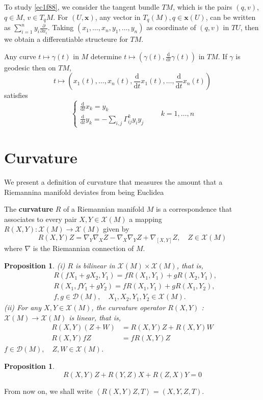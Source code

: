 \documentclass{amsart}
\theoremstyle{plain}
\newtheorem{proposition}[theorem]{Proposition}
\theoremstyle{definition}
\theoremstyle{remark}
\begin{document}
To study \cref{ec1f88}, we consider the tangent bundle $TM$, which is the pairs $(q,v)$, $q\in M$, $v\in T_{q}M$. For $(U,\mathbf{x})$, any vector in $T_{q}(M), q\in \mathbf{x}(U)$, can be written as $\sum_{i=1}^{n}y_i\frac{ \partial   }{ \partial x_i }$. Taking $(x_1,\dots,x_n,y_1,\dots,y_n)$ as coordinate of $(q,v)$ in $TU$, then we obtain a differentiable structeure for $TM$.

Any curve $t\mapsto\gamma(t)$ in $M$ determine $t\mapsto\left( \gamma(t),\frac{\mathrm{d}}{\mathrm{d}t}\gamma(t) \right)$ in $TM$. If $\gamma$ is geodesic then on $TM$,
\[
t\mapsto\left( x_1(t),\dots,x_n(t),\frac{\mathrm{d}}{\mathrm{d}t} x_1(t),\dots,\frac{\mathrm{d}}{\mathrm{d}t} x_n(t) \right)
\]
satisfies
\[
\begin{cases}
\frac{\mathrm{d}}{\mathrm{d}t} x_k=y_k \\
\frac{\mathrm{d}}{\mathrm{d}t} y_k=-\sum_{i,j}\Gamma^{k}_{ij}y_iy_j
\end{cases}\qquad k=1,\dots,n
\]
\section{Curvature}

We present a definition of curvature that measures the amount that a Riemannina manifold deviates from being Euclidea

The \textbf{curvature} $R$ of a Riemannian manifold $M$ is a correspondence that associates to every pair $X, Y \in \mathcal{X}(M)$ a mapping $R(X, Y): \mathcal{X}(M) \rightarrow \mathcal{X}(M)$ given by
\[
R(X, Y) Z=\nabla_Y \nabla_X Z-\nabla_X \nabla_Y Z+\nabla_{[X, Y]} Z, \quad Z \in \mathcal{X}(M)
\]
where $\nabla$ is the Riemannian connection of $M$.

\begin{proposition}
(i) $R$ is bilinear in $\mathcal{X}(M) \times \mathcal{X}(M)$, that is,
\[
\begin{aligned}
& R\left(f X_1+g X_2, Y_1\right)=f R\left(X_1, Y_1\right)+g R\left(X_2, Y_1\right), \\
& R\left(X_1, f Y_1+g Y_2\right)=f R\left(X_1, Y_1\right)+g R\left(X_1, Y_2\right), \\
& f, g \in \mathcal{D}(M), \quad X_1, X_2, Y_1, Y_2 \in \mathcal{X}(M) .
\end{aligned}
\](ii) For any $X, Y \in \mathcal{X}(M)$, the curvature operator $R(X, Y)$ : $\mathcal{X}(M) \rightarrow \mathcal{X}(M)$ is linear, that is,
\[
\begin{aligned}
R(X, Y)(Z+W) & =R(X, Y) Z+R(X, Y) W \\
R(X, Y) f Z & =f R(X, Y) Z
\end{aligned}
\]$f \in \mathcal{D}(M), \quad Z, W \in \mathcal{X}(M)$.
\end{proposition}
\begin{proposition}
\[
R(X, Y) Z+R(Y, Z) X+R(Z, X) Y=0
\]
\end{proposition}
From now on, we shall write $\left< R(X, Y) Z, T\right>=(X, Y, Z, T)$.
\end{document}
